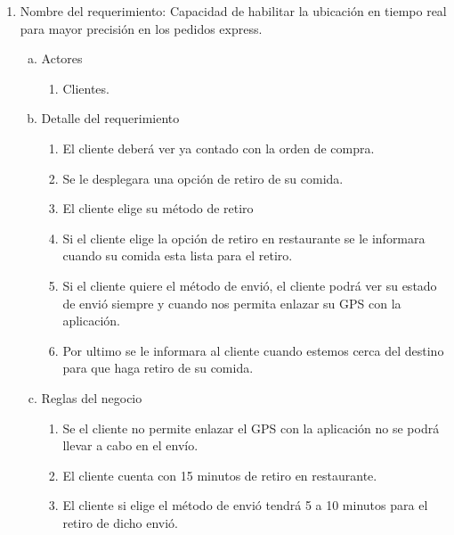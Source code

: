 \documentclass[conference]{IEEEtran}
\begin{document}
\begin{enumerate}
\item Nombre del requerimiento: Capacidad de habilitar la ubicación en tiempo real para mayor precisión en los pedidos express.
\begin{enumerate}[a)]
\item Actores
	\begin{enumerate}[a]
	\item Clientes.
	\end{enumerate}
\item Detalle del requerimiento
	\begin{enumerate}[P{a}so 1.]
	\item El cliente deberá ver ya contado con la orden de compra.
	\item Se le desplegara una opción de retiro de su comida.
	\item El cliente elige su método de retiro 
	\item Si el cliente elige la opción de retiro en restaurante se le informara cuando su comida esta lista para el retiro.
	\item Si el cliente quiere el método de envió, el cliente podrá ver su estado de envió siempre y cuando nos permita enlazar su GPS con la aplicación.
	\item Por ultimo se le informara al cliente cuando estemos cerca del destino para que haga retiro de su comida. 
	\end{enumerate}
\item Reglas del negocio
	\begin{enumerate}[a]
	\item Se el cliente no permite enlazar el GPS con la aplicación no se podrá llevar a cabo en el envío. 
	\item El cliente cuenta con 15 minutos de retiro en restaurante. 
	\item El cliente si elige el método de envió tendrá 5 a 10 minutos para el retiro de dicho envió. 

	\end{enumerate}
\end{enumerate}


\end{enumerate}
\end{document}
